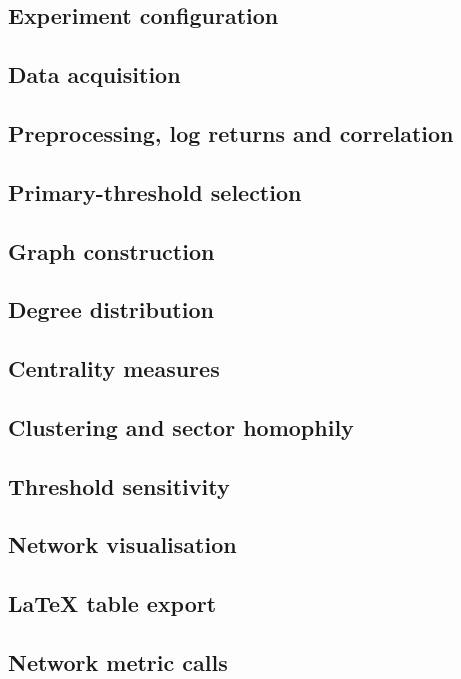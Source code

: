 
\subsection*{Experiment configuration}


\subsection*{Data acquisition}


\subsection*{Preprocessing, log returns and correlation}


\subsection*{Primary-threshold selection}


\subsection*{Graph construction}


\subsection*{Degree distribution}


\subsection*{Centrality measures}


\subsection*{Clustering and sector homophily}


\subsection*{Threshold sensitivity}


\subsection*{Network visualisation}


\subsection*{LaTeX table export}


\subsection*{Network metric calls}

